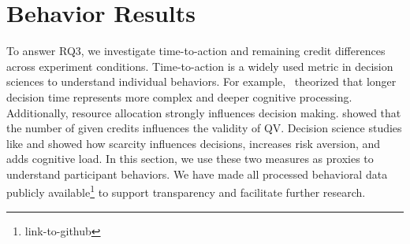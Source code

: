 \section{Behavior Results}
\label{sec:behave_result}
To answer RQ3, we investigate time-to-action and remaining credit differences across experiment conditions. Time-to-action is a widely used metric in decision sciences to understand individual behaviors. For example,~\textcite{payneAdaptiveDecisionMaker1993} theorized that longer decision time represents more complex and deeper cognitive processing. Additionally, resource allocation strongly influences decision making. \textcite{chengCanShowWhat2021} showed that the number of given credits influences the validity of QV. Decision science studies like \textcite{Shah2015a} and \cite{debruijnPovertyEconomicDecision2022} showed how scarcity influences decisions, increases risk aversion, and adds cognitive load. In this section, we use these two measures as proxies to understand participant behaviors. We have made all processed behavioral data publicly available\footnote{link-to-github} to support transparency and facilitate further research.


